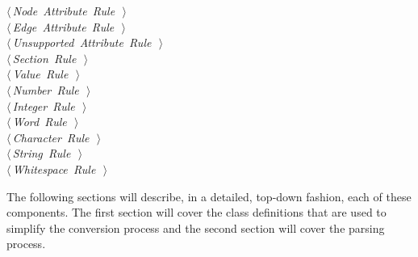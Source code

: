 \documentclass[a4paper]{report}
\begin{document}
\begin{flushleft}
\begin{minipage}{\linewidth}
\begin{list}{}{}
\mbox{}\verb@@\hbox{$\langle\,${\itshape Node Attribute Rule}\nobreak\ {\footnotesize {}}$\,\rangle$}\verb@@\\
\mbox{}\verb@@\hbox{$\langle\,${\itshape Edge Attribute Rule}\nobreak\ {\footnotesize {}}$\,\rangle$}\verb@@\\
\mbox{}\verb@@\hbox{$\langle\,${\itshape Unsupported Attribute Rule}\nobreak\ {\footnotesize {}}$\,\rangle$}\verb@@\\
\mbox{}\verb@@\hbox{$\langle\,${\itshape Section Rule}\nobreak\ {\footnotesize {}}$\,\rangle$}\verb@@\\
\mbox{}\verb@@\hbox{$\langle\,${\itshape Value Rule}\nobreak\ {\footnotesize {}}$\,\rangle$}\verb@@\\
\mbox{}\verb@@\hbox{$\langle\,${\itshape Number Rule}\nobreak\ {\footnotesize {}}$\,\rangle$}\verb@@\\
\mbox{}\verb@@\hbox{$\langle\,${\itshape Integer Rule}\nobreak\ {\footnotesize {}}$\,\rangle$}\verb@@\\
\mbox{}\verb@@\hbox{$\langle\,${\itshape Word Rule}\nobreak\ {\footnotesize {}}$\,\rangle$}\verb@@\\
\mbox{}\verb@@\hbox{$\langle\,${\itshape Character Rule}\nobreak\ {\footnotesize {}}$\,\rangle$}\verb@@\\
\mbox{}\verb@@\hbox{$\langle\,${\itshape String Rule}\nobreak\ {\footnotesize {}}$\,\rangle$}\verb@@\\
\mbox{}\verb@@\hbox{$\langle\,${\itshape Whitespace Rule}\nobreak\ {\footnotesize {}}$\,\rangle$}\verb@@\\
\mbox{}\verb@@{\NWsep}
\end{list}
\vspace{-1.5ex}
\footnotesize
\begin{list}{}{\setlength{\itemsep}{-\parsep}\setlength{\itemindent}{-\leftmargin}}

\item{}
\end{list}
\end{minipage}\vspace{4ex}
\end{flushleft}
The following sections will describe, in a detailed, top-down fashion, each of these components. The first section will cover the class definitions that are used to simplify the conversion process and the second section will cover the parsing process.
\end{document}
